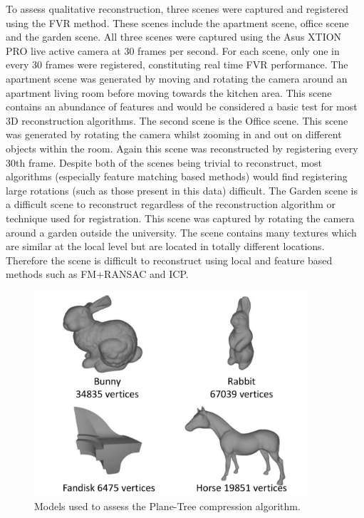 To assess qualitative reconstruction, three scenes were captured and registered using the FVR method. These scenes include the apartment scene, office scene and the garden scene. All three scenes were captured using the Asus XTION PRO live active camera at 30 frames per second. For each scene, only one in every 30 frames were registered, constituting real time FVR performance. The apartment scene was generated by moving and rotating the camera around an apartment living room before moving towards the kitchen area. This scene contains an abundance of features and would be considered a basic test for most 3D reconstruction algorithms. The second scene is the Office scene. This scene was generated by rotating the camera whilst zooming in and out on different objects within the room. Again this scene was reconstructed by registering every 30th frame. Despite both of the scenes being trivial to reconstruct, most algorithms (especially feature matching based methods) would find registering large rotations (such as those present in this data) difficult. The Garden scene is a difficult scene to reconstruct regardless of the reconstruction algorithm or technique used for registration. This scene was captured by rotating the camera around a garden outside the university. The scene contains many textures which are similar at the local level but are located in totally different locations. Therefore the scene is difficult to reconstruct using local and feature based methods such as FM+RANSAC and ICP. \\


\begin{figure}[!htb]
\centering
\includegraphics[width=4.0in]{images/experiments/test_data/modelsused}
\caption{Models used to assess the Plane-Tree compression algorithm.}
\label{fig:MODELSUSEDA}
\end{figure}


